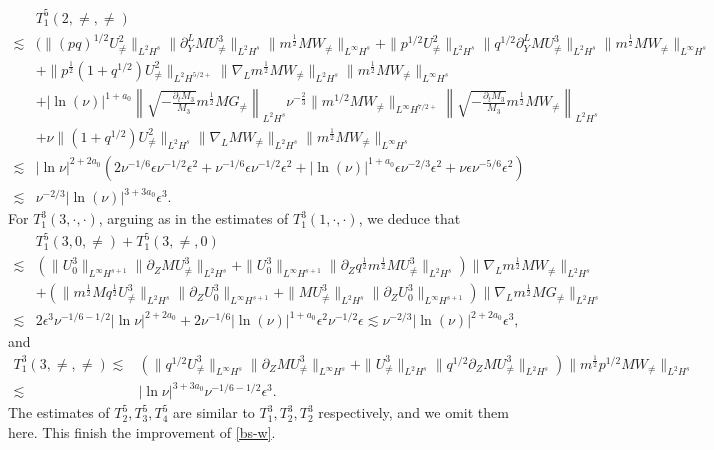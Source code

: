 \documentclass[12pt]{article}
\numberwithin{equation}{section}
\begin{document}
    \begin{align*}
		~&T^5_1(2,\neq,\neq)\\
        \lesssim&(\| (pq)^{1/2} U^2_{\neq}\|_{L^2H^s}\|\partial_Y^L M U^3_{\neq}\|_{L^2H^s} \|m^{\frac{1}{2}}M W_{\neq}\|_{L^\infty H^s}+\| p^{1/2} U^2_{\neq}\|_{L^2H^s}\|  q^{1/2} \partial_Y^L MU^3_{\neq}\|_{L^2H^s}\|m^{\frac{1}{2}} M W_{\neq}\|_{L^\infty H^s} \\
		&+\|p^{\frac{1}{2}} (1+q^{1/2})U^2_{\neq}\|_{L^2H^{5/2+}}\|\nabla_Lm^{\frac{1}{2}}M W_{\neq}\|_{L^2H^s}\|m^{\frac{1}{2}}M W_{\neq}\|_{L^{\infty}H^{s}}\\
		&+|\ln(\nu)|^{1+a_0}\left\|\sqrt{-\frac{\partial_tM_3}{M_3}}m^{\frac{1}{2}}M G_{\neq}\right\|_{L^2H^s}\nu^{-\frac{2}{3}} \|m^{1/2}M W_{\neq}\|_{L^{\infty}H^{7/2+}}\left\|\sqrt{-\frac{\partial_tM_3}{M_3}}m^{\frac{1}{2}}M W_{\neq}\right\|_{L^2H^{s}}\\
		&+\nu\| (1+q^{1/2}) U^2_{\neq}\|_{L^2H^s}\|\nabla_L MW_{\neq}\|_{L^2H^s}\|m^{\frac{1}{2}}M W_{\neq}\|_{L^{\infty} H^{s}}\\
		\lesssim& |\ln{\nu}|^{2+2a_0}(2\nu^{-1/6}\epsilon\nu^{-1/2}\epsilon^2+\nu^{-1/6}\epsilon\nu^{-1/2}\epsilon^2+|\ln(\nu)|^{1+a_0}\epsilon\nu^{-2/3}\epsilon^2+\nu \epsilon\nu^{-5/6}\epsilon^2)\\
		\lesssim&\nu^{-2/3}|\ln(\nu)|^{3+3a_0}\epsilon^3.
	\end{align*}
	For $T^3_1(3,\cdot,\cdot)$, arguing as in the estimates of $T^3_1(1,\cdot,\cdot)$, we deduce that
	\begin{align*}
		&T^5_1(3,0,\neq)+T^5_1(3,\neq,0)\\
		\lesssim&(\|U^3_0\|_{L^\infty H^{s+1}}\|\partial_ZMU^3_{\neq}\|_{L^2H^s}+\|U^3_0\|_{L^\infty H^{s+1}}\|\partial_Z q^{\frac{1}{2}}m^{\frac{1}{2}}MU^3_{\neq}\|_{L^2H^s})\|\nabla_Lm^{\frac{1}{2}}MW_{\neq}\|_{L^2 H^s}\\
		&+(\|m^{\frac{1}{2}}Mq^{\frac{1}{2}}U^3_{\neq}\|_{L^2H^s}\|\partial_Z U^3_0\|_{L^\infty H^{s+1}}+\|MU^3_{\neq}\|_{L^2H^s}\|\partial_ZU^3_0\|_{L^\infty H^{s+1}})\|\nabla_L m^{\frac{1}{2}}MG_{\neq}\|_{L^2H^s}\\
		\lesssim&2\epsilon^3  \nu^{-1/6-1/2} |\ln{\nu}|^{2+2a_0} +2\nu^{-1/6}|\ln(\nu)|^{1+a_0}\epsilon^2\nu^{-1/2}\epsilon\lesssim\nu^{-2/3}|\ln(\nu)|^{2+2a_0}\epsilon^3,
	\end{align*}
	and
	\begin{align*}
		T^3_1(3,\neq,\neq)\lesssim & \left( \| q^{1/2} U^3_{\neq}\|_{L^{\infty}H^s}\|\partial_Z M  U^3_{\neq}\|_{L^{\infty}H^s} +\|  U^3_{\neq}\|_{L^2H^s}\|q^{1/2}\partial_Z M  U^3_{\neq}\|_{L^2H^s} \right) \|m^{\frac{1}{2}} p^{1/2} M W_{\neq}\|_{L^2 H^{s}}\\
        \lesssim & |\ln{\nu}|^{3+3a_0} \nu^{-1/6-1/2} \epsilon^3.
	\end{align*}
    The estimates of $T^5_2, T^5_3, T^5_4$ are similar to $T^3_1, T^3_2, T^3_2$ respectively, and we omit them here. This finish the improvement of \eqref{bs-w}.
\end{document}
